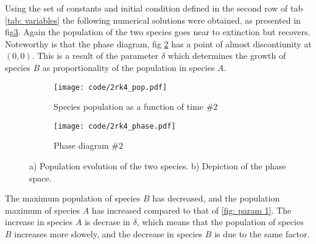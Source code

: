 \documentclass[a4paper]{article}
\begin{document}
\noindent
Using the set of constants and initial condition defined in the second row of tab \ref{tab: variables} the following numerical solutions were obtained, as presented in fig\ref{fig: param 2}. Again the population of the two species goes near to extinction but recovers. Noteworthy is that the phase diagram, fig \ref{fig: param 2 phase} has a point of almost discontiunity at $(0,0)$. This is a result of the parameter $\delta$ which determines the growth of species $B$ as proportionality of the population in species $A$.
\begin{figure}[H]
    \centering
    \begin{subfigure}{0.45\textwidth}
        \texttt{[image: code/2rk4\_pop.pdf]}
        \caption{Species population as a function of time $\#2$}
        \label{fig: param 2 pop}
    \end{subfigure}
    \hfill    
    \begin{subfigure}{0.45\textwidth}
        \texttt{[image: code/2rk4\_phase.pdf]}
        \caption{Phase diagram $\#2$}
        \label{fig: param 2 phase}
    \end{subfigure}
    \caption{a) Population evolution of the two species. b) Depiction of the phase space.}
    \label{fig: param 2}
\end{figure}\noindent
The maximum population of species $B$ has decreased, and the population maximum of species $A$ has increased compared to that of \ref{fig: param 1}. The increase in species $A$ is decrase in $\delta$, which means that the population of species $B$ increases more slowely, and the decrease in species $B$ is due to the same factor.
\end{document}
